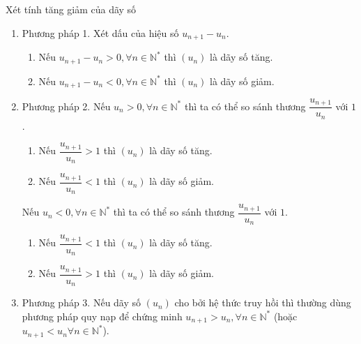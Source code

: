 \begin{dang}{Xét tính tăng giảm của dãy số}
	\begin{enumerate}
		\item Phương pháp 1. Xét dấu của hiệu số $u_{n+1}-u_n$.
		\begin{enumerate}
			\item Nếu $u_{n+1}-u_n>0, \forall n \in \mathbb{N}^\ast$ thì $(u_n)$ là dãy số tăng.
			\item Nếu $u_{n+1}-u_n<0, \forall n \in \mathbb{N}^\ast$ thì $(u_n)$ là dãy số giảm.
		\end{enumerate}
		\item Phương pháp 2. Nếu $u_n>0, \forall n\in \mathbb{N}^\ast$ thì ta có thể so sánh thương $\dfrac{u_{n+1}}{u_n}$ với $1$.
		\begin{enumerate}
			\item Nếu $\dfrac{u_{n+1}}{u_n}>1$ thì $(u_n)$ là dãy số tăng.
			\item Nếu $\dfrac{u_{n+1}}{u_n}<1$ thì $(u_n)$ là dãy số giảm.
		\end{enumerate}
		Nếu $u_n<0, \forall n\in \mathbb{N}^\ast$ thì ta có thể so sánh thương $\dfrac{u_{n+1}}{u_n}$ với $1$.
		\begin{enumerate}
			\item Nếu $\dfrac{u_{n+1}}{u_n}<1$ thì $(u_n)$ là dãy số tăng.
			\item Nếu $\dfrac{u_{n+1}}{u_n}>1$ thì $(u_n)$ là dãy số giảm.
		\end{enumerate}
		\item Phương pháp 3. Nếu dãy số $(u_n)$ cho bởi hệ thức truy hồi thì thường dùng phương pháp quy nạp để chứng minh $u_{n+1}>u_n, \forall n \in \mathbb{N}^\ast$ (hoặc $u_{n+1}<u_n \forall n \in \mathbb{N}^\ast$).
	\end{enumerate}
\end{dang}
